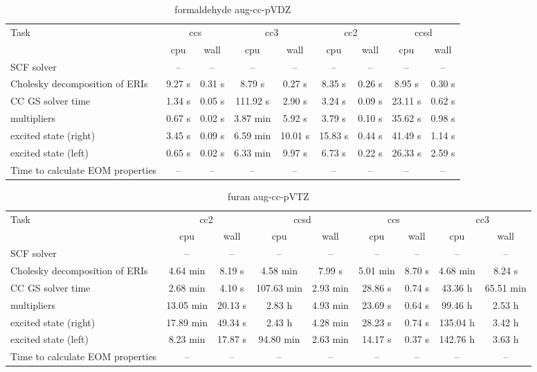 \documentclass{article}
\begin{document}
\begin{table}
\caption{formaldehyde aug-cc-pVDZ}
\begin{tabular}{lcccccccc}
\toprule
Task & \multicolumn{2}{c}{ccs} & \multicolumn{2}{c}{cc3} & \multicolumn{2}{c}{cc2} & \multicolumn{2}{c}{ccsd}\\
\cmidrule(lr){2-3}\cmidrule(lr){4-5}\cmidrule(lr){6-7}\cmidrule(lr){8-9}
 & cpu & wall & cpu & wall & cpu & wall & cpu & wall\\
\midrule
SCF solver & -- & -- & -- & -- & -- & -- & -- & --\\
Cholesky decomposition of ERIs & 9.27 s & 0.31 s & 8.79 s & 0.27 s & 8.35 s & 0.26 s & 8.95 s & 0.30 s\\
CC GS solver time & 1.34 s & 0.05 s & 111.92 s & 2.90 s & 3.24 s & 0.09 s & 23.11 s & 0.62 s\\
multipliers & 0.67 s & 0.02 s & 3.87 min & 5.92 s & 3.79 s & 0.10 s & 35.62 s & 0.98 s\\
excited state (right) & 3.45 s & 0.09 s & 6.59 min & 10.01 s & 15.83 s & 0.44 s & 41.49 s & 1.14 s\\
excited state (left) & 0.65 s & 0.02 s & 6.33 min & 9.97 s & 6.73 s & 0.22 s & 26.33 s & 2.59 s\\
Time to calculate EOM properties & -- & -- & -- & -- & -- & -- & -- & --\\
\bottomrule
\end{tabular}
\end{table}
\begin{table}
\caption{furan aug-cc-pVTZ}
\begin{tabular}{lcccccccc}
\toprule
Task & \multicolumn{2}{c}{cc2} & \multicolumn{2}{c}{ccsd} & \multicolumn{2}{c}{ccs} & \multicolumn{2}{c}{cc3}\\
\cmidrule(lr){2-3}\cmidrule(lr){4-5}\cmidrule(lr){6-7}\cmidrule(lr){8-9}
 & cpu & wall & cpu & wall & cpu & wall & cpu & wall\\
\midrule
SCF solver & -- & -- & -- & -- & -- & -- & -- & --\\
Cholesky decomposition of ERIs & 4.64 min & 8.19 s & 4.58 min & 7.99 s & 5.01 min & 8.70 s & 4.68 min & 8.24 s\\
CC GS solver time & 2.68 min & 4.10 s & 107.63 min & 2.93 min & 28.86 s & 0.74 s & 43.36 h & 65.51 min\\
multipliers & 13.05 min & 20.13 s & 2.83 h & 4.93 min & 23.69 s & 0.64 s & 99.46 h & 2.53 h\\
excited state (right) & 17.89 min & 49.34 s & 2.43 h & 4.28 min & 28.23 s & 0.74 s & 135.04 h & 3.42 h\\
excited state (left) & 8.23 min & 17.87 s & 94.80 min & 2.63 min & 14.17 s & 0.37 s & 142.76 h & 3.63 h\\
Time to calculate EOM properties & -- & -- & -- & -- & -- & -- & -- & --\\
\bottomrule
\end{tabular}
\end{table}
\end{document}
